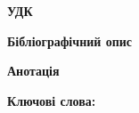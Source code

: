 \begingroup
\thispagestyle{empty}
\sffamily
\small

\noindent\textbf{УДК} \ITinLingvoUDC

\vspace{1.2cm}

\noindent\textbf{Бібліографічний опис}

\vspace{0.35cm}

\noindent\ITinLingvoBibliography

\vspace{0.45cm}

\noindent\ITinLingvoExtent

\vspace{1.2cm}

\noindent\textbf{Анотація}

\vspace{0.35cm}

\noindent\ITinLingvoAnnotation

\vspace{0.8cm}

\noindent\textbf{Ключові слова:} \ITinLingvoKeywords

\vfill

\noindent\ITinLingvoCopyright

\clearpage
\endgroup
\cleardoublepage
